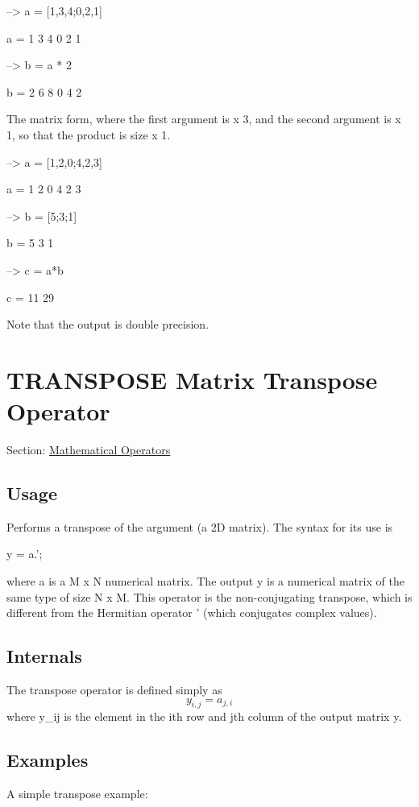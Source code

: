 \begin{DoxyVerbInclude}
--> a = [1,3,4;0,2,1]

a = 
 1 3 4 
 0 2 1 

--> b = a * 2

b = 
 2 6 8 
 0 4 2 
\end{DoxyVerbInclude}


The matrix form, where the first argument is { x 3}, and the second argument is { x 1}, so that the product is size { x 1}.


\begin{DoxyVerbInclude}
--> a = [1,2,0;4,2,3]

a = 
 1 2 0 
 4 2 3 

--> b = [5;3;1]

b = 
 5 
 3 
 1 

--> c = a*b

c = 
 11 
 29 
\end{DoxyVerbInclude}


Note that the output is double precision. \hypertarget{operators_transpose}{}\section{T\-R\-A\-N\-S\-P\-O\-S\-E Matrix Transpose Operator}\label{operators_transpose}
Section\-: \hyperlink{sec_operators}{Mathematical Operators} \hypertarget{vtkwidgets_vtkxyplotwidget_Usage}{}\subsection{Usage}\label{vtkwidgets_vtkxyplotwidget_Usage}
Performs a transpose of the argument (a 2\-D matrix). The syntax for its use is \begin{DoxyVerb}  y = a.';
\end{DoxyVerb}
 where {\ttfamily a} is a {\ttfamily M x N} numerical matrix. The output {\ttfamily y} is a numerical matrix of the same type of size {\ttfamily N x M}. This operator is the non-\/conjugating transpose, which is different from the Hermitian operator {\ttfamily '} (which conjugates complex values). \hypertarget{transforms_svd_Function}{}\subsection{Internals}\label{transforms_svd_Function}
The transpose operator is defined simply as \[ y_{i,j} = a_{j,i} \] where {\ttfamily y\-\_\-ij} is the element in the {\ttfamily i}th row and {\ttfamily j}th column of the output matrix {\ttfamily y}. \hypertarget{variables_matrix_Examples}{}\subsection{Examples}\label{variables_matrix_Examples}
A simple transpose example\-:


